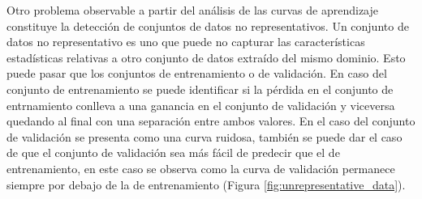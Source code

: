 Otro problema observable a partir del análisis de las curvas de aprendizaje constituye la detección de conjuntos
de datos no representativos. Un conjunto de datos no representativo es uno que puede no 
capturar las características estadísticas relativas a otro conjunto de datos extraído del mismo dominio.
Esto puede pasar que los conjuntos de entrenamiento o de validación. En caso del conjunto de entrenamiento
se puede identificar si la pérdida en el conjunto de entrnamiento conlleva a una ganancia en el conjunto de 
validación y viceversa quedando al final con una separación entre ambos valores. En el caso del conjunto de 
validación se presenta como una curva ruidosa, también se puede dar el caso de que el conjunto  de validación
sea más fácil de predecir que el de entrenamiento, en este caso se observa como la curva de validación permanece
siempre por debajo de la de entrenamiento (Figura \ref{fig:unrepresentative_data}).

